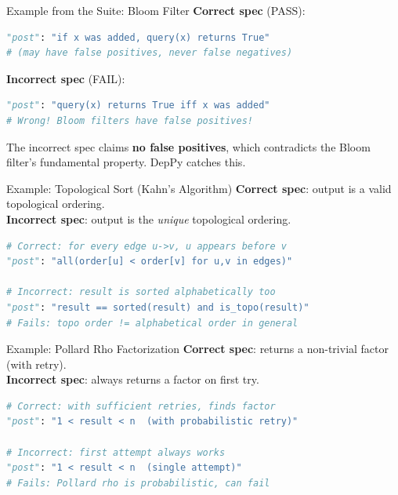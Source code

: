 \documentclass[aspectratio=169,10pt]{beamer}
\begin{document}
\begin{frame}[fragile]{Example from the Suite: Bloom Filter}
\textbf{Correct spec} (PASS):
\begin{lstlisting}[language=Python, basicstyle=\ttfamily\scriptsize]
"post": "if x was added, query(x) returns True"
# (may have false positives, never false negatives)
\end{lstlisting}
\textbf{Incorrect spec} (FAIL):
\begin{lstlisting}[language=Python, basicstyle=\ttfamily\scriptsize]
"post": "query(x) returns True iff x was added"
# Wrong! Bloom filters have false positives!
\end{lstlisting}
\vspace{0.3em}
The incorrect spec claims \textbf{no false positives}, which contradicts the Bloom filter's fundamental property. DepPy catches this.
\end{frame}

\begin{frame}[fragile]{Example: Topological Sort (Kahn's Algorithm)}
\textbf{Correct spec}: output is a valid topological ordering.\\
\textbf{Incorrect spec}: output is the \emph{unique} topological ordering.
\vspace{0.3em}
\begin{lstlisting}[language=Python, basicstyle=\ttfamily\scriptsize]
# Correct: for every edge u->v, u appears before v
"post": "all(order[u] < order[v] for u,v in edges)"

# Incorrect: result is sorted alphabetically too
"post": "result == sorted(result) and is_topo(result)"
# Fails: topo order != alphabetical order in general
\end{lstlisting}
\end{frame}

\begin{frame}[fragile]{Example: Pollard Rho Factorization}
\textbf{Correct spec}: returns a non-trivial factor (with retry).\\
\textbf{Incorrect spec}: always returns a factor on first try.
\vspace{0.3em}
\begin{lstlisting}[language=Python, basicstyle=\ttfamily\scriptsize]
# Correct: with sufficient retries, finds factor
"post": "1 < result < n  (with probabilistic retry)"

# Incorrect: first attempt always works
"post": "1 < result < n  (single attempt)"
# Fails: Pollard rho is probabilistic, can fail
\end{lstlisting}
\end{frame}
\end{document}
